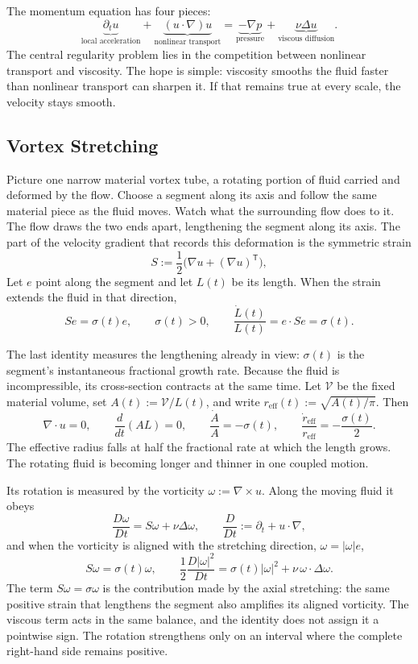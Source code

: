 
The momentum equation has four pieces:
\[
  \underbrace{\partial_t u}_{\text{local acceleration}}
  +
  \underbrace{(u\cdot\nabla)u}_{\text{nonlinear transport}}
  =
  \underbrace{-\nabla p}_{\text{pressure}}
  +
  \underbrace{\nu\Delta u}_{\text{viscous diffusion}}.
\]
The central regularity problem lies in the competition between nonlinear transport and viscosity.
The hope is simple: viscosity smooths the fluid faster than nonlinear transport can sharpen it.
If that remains true at every scale, the velocity stays smooth.

\subsection{Vortex Stretching}\label{sub:ThePerfectlyStretchingVortex}

Picture one narrow material vortex tube, a rotating portion of fluid carried and deformed by the flow.
Choose a segment along its axis and follow the same material piece as the fluid moves.
Watch what the surrounding flow does to it.
The flow draws the two ends apart, lengthening the segment along its axis.
The part of the velocity gradient that records this deformation is the symmetric strain
\[
  S:=\frac12\bigl(\nabla u+(\nabla u)^{\mathsf T}\bigr),
\]
Let \(e\) point along the segment and let \(L(t)\) be its length.
When the strain extends the fluid in that direction,
\[
  Se=\sigma(t)e,
  \qquad
  \sigma(t)>0,
  \qquad
  \frac{\dot L(t)}{L(t)}
  =
  e\cdot Se
  =
  \sigma(t).
\]

The last identity measures the lengthening already in view: \(\sigma(t)\) is the segment's instantaneous fractional growth rate.
Because the fluid is incompressible, its cross-section contracts at the same time.
Let \(\mathcal V\) be the fixed material volume, set \(A(t):=\mathcal V/L(t)\), and write \(r_{\mathrm{eff}}(t):=\sqrt{A(t)/\pi}\).
Then
\[
  \nabla\cdot u=0,
  \qquad
  \frac{d}{dt}(A L)=0,
  \qquad
  \frac{\dot A}{A}=-\sigma(t),
  \qquad
  \frac{\dot r_{\mathrm{eff}}}{r_{\mathrm{eff}}}
  =
  -\frac{\sigma(t)}{2}.
\]
The effective radius falls at half the fractional rate at which the length grows.
The rotating fluid is becoming longer and thinner in one coupled motion.

Its rotation is measured by the vorticity \(\omega:=\nabla\times u\).
Along the moving fluid it obeys
\[
  \frac{D\omega}{Dt}
  =
  S\omega+\nu\Delta\omega,
  \qquad
  \frac{D}{Dt}
  :=
  \partial_t+u\cdot\nabla,
\]
and when the vorticity is aligned with the stretching direction, \(\omega=|\omega|e\),
\[
  S\omega
  =
  \sigma(t)\omega,
  \qquad
  \frac12\frac{D|\omega|^2}{Dt}
  =
  \sigma(t)|\omega|^2
  +
  \nu\,\omega\cdot\Delta\omega.
\]
The term \(S\omega=\sigma\omega\) is the contribution made by the axial stretching: the same positive strain that lengthens the segment also amplifies its aligned vorticity.
The viscous term acts in the same balance, and the identity does not assign it a pointwise sign.
The rotation strengthens only on an interval where the complete right-hand side remains positive.

